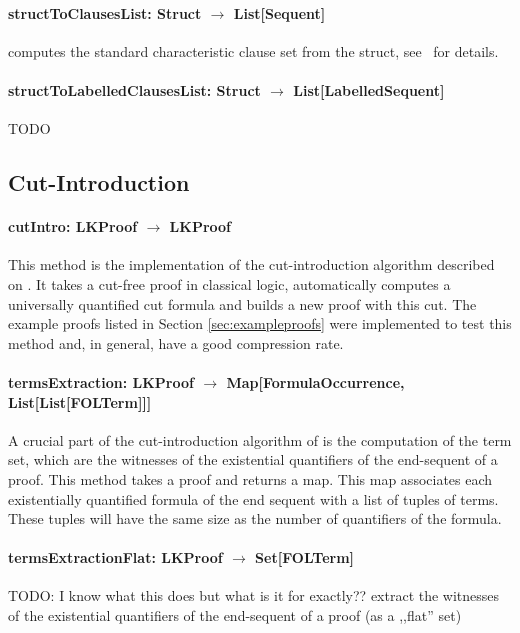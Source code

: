 \documentclass[a4paper, 11pt]{report}
\begin{document}
\paragraph{\textbf{structToClausesList: Struct $\rightarrow$ List[Sequent]}} computes
the standard characteristic clause set
from the struct, see~\cite[Section 4.2.1]{WoltzenlogelPaleo09General} for details.

\paragraph{\textbf{structToLabelledClausesList: Struct $\rightarrow$ List[LabelledSequent]}}
{\color{red}TODO}

\subsection{Cut-Introduction}

\paragraph{\textbf{cutIntro: LKProof $\rightarrow$ LKProof}}
This method is the implementation of the cut-introduction algorithm described on
\cite{Hetzl2012}. It takes a cut-free proof in classical logic, automatically
computes a universally quantified cut formula and builds a new proof with this
cut. The example proofs listed in Section \ref{sec:exampleproofs} were
implemented to test this method and, in general, have a good compression rate.

\paragraph{\textbf{termsExtraction: LKProof $\rightarrow$ Map[FormulaOccurrence, List[List[FOLTerm]]]}}
A crucial part of the cut-introduction algorithm of \cite{Hetzl2012} is the
computation of the term set, which are the witnesses of the existential
quantifiers of the end-sequent of a proof. This method takes a proof and returns
a map. This map associates each existentially quantified formula of the end
sequent with a list of tuples of terms. These tuples will have the same size as
the number of quantifiers of the formula.

\paragraph{\textbf{termsExtractionFlat: LKProof $\rightarrow$ Set[FOLTerm]}}
{\color{red}TODO: I know what this does but what is it for exactly??} extract
the witnesses of the existential quantifiers of the end-sequent of a proof (as a
,,flat'' set)
\end{document}
